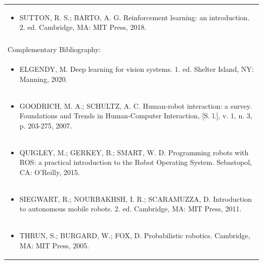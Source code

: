 \documentclass[11pt]{article}
\begin{document}
\begin{center}
\begin{longtable}{|p{4cm}|p{4cm}|p{4cm}|p{4cm}|}
\multicolumn{4}{|p{\dimexpr 16cm + 6\tabcolsep\relax}|}{\begin{itemize}\item SUTTON, R. S.; BARTO, A. G. Reinforcement learning: an introduction. 2. ed. Cambridge, MA: MIT Press, 2018.\end{itemize}}\\
\multicolumn{4}{|p{16cm}|}{}\\
\hline
\multicolumn{4}{|p{16cm}|}{Complementary Bibliography:}\\*
\multicolumn{4}{|p{\dimexpr 16cm + 6\tabcolsep\relax}|}{\begin{itemize}\item ELGENDY, M. Deep learning for vision systems. 1. ed. Shelter Island, NY: Manning, 2020.\end{itemize}}\\
\multicolumn{4}{|p{\dimexpr 16cm + 6\tabcolsep\relax}|}{\begin{itemize}\item GOODRICH, M. A.; SCHULTZ, A. C. Human-robot interaction: a survey. Foundations and Trends in Human-Computer Interaction, [S. l.], v. 1, n. 3, p. 203-275, 2007.\end{itemize}}\\
\multicolumn{4}{|p{\dimexpr 16cm + 6\tabcolsep\relax}|}{\begin{itemize}\item QUIGLEY, M.; GERKEY, B.; SMART, W. D. Programming robots with ROS: a practical introduction to the Robot Operating System. Sebastopol, CA: O'Reilly, 2015.\end{itemize}}\\
\multicolumn{4}{|p{\dimexpr 16cm + 6\tabcolsep\relax}|}{\begin{itemize}\item SIEGWART, R.; NOURBAKHSH, I. R.; SCARAMUZZA, D. Introduction to autonomous mobile robots. 2. ed. Cambridge, MA: MIT Press, 2011.\end{itemize}}\\
\multicolumn{4}{|p{\dimexpr 16cm + 6\tabcolsep\relax}|}{\begin{itemize}\item THRUN, S.; BURGARD, W.; FOX, D. Probabilistic robotics. Cambridge, MA: MIT Press, 2005.\end{itemize}}\\
\hline
\end{longtable}
\end{center}

\clearpage
\end{document}
